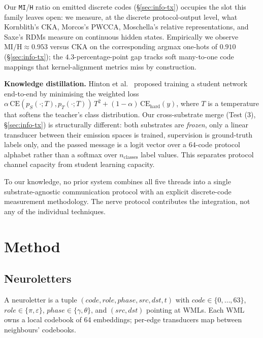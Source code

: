 \documentclass[10pt,twocolumn]{article}
\begin{document}
Our \texttt{MI}/\texttt{H} ratio on emitted discrete codes (\S\ref{sec:info-tx}) occupies the slot this family leaves open: we measure, at the discrete protocol-output level, what Kornblith's CKA, Morcos's PWCCA, Moschella's relative representations, and Saxe's RDMs measure on continuous hidden states. Empirically we observe $\mathrm{MI}/\mathrm{H} \approx 0.953$ versus $\mathrm{CKA}$ on the corresponding argmax one-hots of $0.910$ (\S\ref{sec:info-tx}); the $4.3$-percentage-point gap tracks soft many-to-one code mappings that kernel-alignment metrics miss by construction.

\textbf{Knowledge distillation.} Hinton et al.~\cite{hinton2015distilling} proposed training a student network end-to-end by minimising the weighted loss $\alpha\,\mathrm{CE}(p_S(\cdot; T), p_T(\cdot; T))\,T^2 + (1-\alpha)\,\mathrm{CE}_{\mathrm{hard}}(y)$, where $T$ is a temperature that softens the teacher's class distribution. Our cross-substrate merge (Test (3), \S\ref{sec:info-tx}) is structurally different: both substrates are \emph{frozen}, only a linear transducer between their emission spaces is trained, supervision is ground-truth labels only, and the passed message is a logit vector over a $64$-code protocol alphabet rather than a softmax over $n_{\mathrm{classes}}$ label values. This separates protocol channel capacity from student learning capacity.

To our knowledge, no prior system combines all five threads into a single substrate-agnostic communication protocol with an explicit discrete-code measurement methodology. The nerve protocol contributes the integration, not any of the individual techniques.

\section{Method}
\label{sec:method}

\subsection{Neuroletters}
A neuroletter is a tuple $(code, role, phase, src, dst, t)$ with
$code \in \{0, \dots, 63\}$, $role \in \{\pi, \varepsilon\}$,
$phase \in \{\gamma, \theta\}$, and $(src, dst)$ pointing at WMLs.
Each WML owns a local codebook of 64 embeddings; per-edge
transducers map between neighbours' codebooks.
\end{document}

